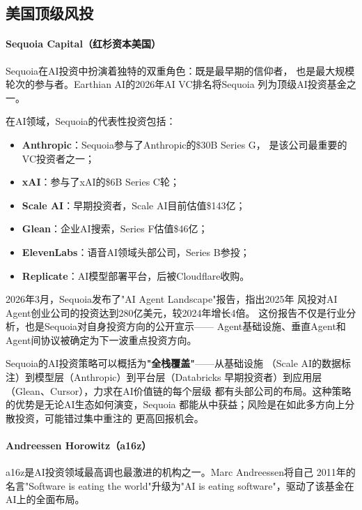 \subsection{美国顶级风投}
\label{subsec:fund-us-vc}

\paragraph{Sequoia Capital（红杉资本美国）}

Sequoia在AI投资中扮演着独特的双重角色：既是最早期的信仰者，
也是最大规模轮次的参与者。Earthian AI的2026年AI VC排名将Sequoia
列为顶级AI投资基金之一。

在AI领域，Sequoia的代表性投资包括：
\begin{itemize}
  \item \textbf{Anthropic}：Sequoia参与了Anthropic的\$30B Series G，
    是该公司最重要的VC投资者之一；
  \item \textbf{xAI}：参与了xAI的\$6B Series C轮；
  \item \textbf{Scale AI}：早期投资者，Scale AI目前估值\$143亿；
  \item \textbf{Glean}：企业AI搜索，Series F估值\$46亿；
  \item \textbf{ElevenLabs}：语音AI领域头部公司，Series B参投；
  \item \textbf{Replicate}：AI模型部署平台，后被Cloudflare收购。
\end{itemize}

2026年3月，Sequoia发布了"AI Agent Landscape"报告，指出2025年
风投对AI Agent创业公司的投资达到280亿美元，较2024年增长4倍。
这份报告不仅是行业分析，也是Sequoia对自身投资方向的公开宣示——
Agent基础设施、垂直Agent和Agent间协议被确定为下一波重点投资方向。

Sequoia的AI投资策略可以概括为\textbf{"全栈覆盖"}——从基础设施
（Scale AI的数据标注）到模型层（Anthropic）到平台层（Databricks
早期投资者）到应用层（Glean、Cursor），力求在AI价值链的每个层级
都有头部公司的布局。这种策略的优势是无论AI生态如何演变，Sequoia
都能从中获益；风险是在如此多方向上分散投资，可能错过集中重注的
更高回报机会。

\paragraph{Andreessen Horowitz（a16z）}

a16z是AI投资领域最高调也最激进的机构之一。Marc Andreessen将自己
2011年的名言"Software is eating the world"升级为"AI is eating
software"，驱动了该基金在AI上的全面布局。

